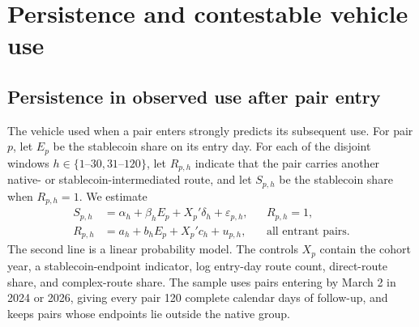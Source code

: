 \section{Persistence and contestable vehicle use}
\label{sec:executability}

\subsection{Persistence in observed use after pair entry}
\label{sec:dominance:entry-persistence}

The vehicle used when a pair enters strongly predicts its subsequent use. For pair $p$, let $E_p$ be the stablecoin share on its entry day. For each of the disjoint windows $h\in\{1\text{--}30,31\text{--}120\}$, let $R_{p,h}$ indicate that the pair carries another native- or stablecoin-intermediated route, and let $S_{p,h}$ be the stablecoin share when $R_{p,h}=1$. We estimate
\begin{equation}
\label{eq:entry-persistence}
\begin{aligned}
S_{p,h}&=\alpha_h+\beta_h E_p+X_p'\delta_h+\varepsilon_{p,h},
&& R_{p,h}=1,\\
R_{p,h}&=a_h+b_h E_p+X_p'c_h+u_{p,h},
&& \text{all entrant pairs}.
\end{aligned}
\end{equation}
The second line is a linear probability model. The controls $X_p$ contain the cohort year, a stablecoin-endpoint indicator, log entry-day route count, direct-route share, and complex-route share. The sample uses pairs entering by March 2 in 2024 or 2026, giving every pair 120 complete calendar days of follow-up, and keeps pairs whose endpoints lie outside the native group.

\FloatBarrier
\begin{table}[tbp]
\centering
\caption{Persistence in observed vehicle use after pair entry}
\label{tab:entry-persistence}
{\scriptsize
\renewcommand{\arraystretch}{0.94}

}
\end{table}
\FloatBarrier

